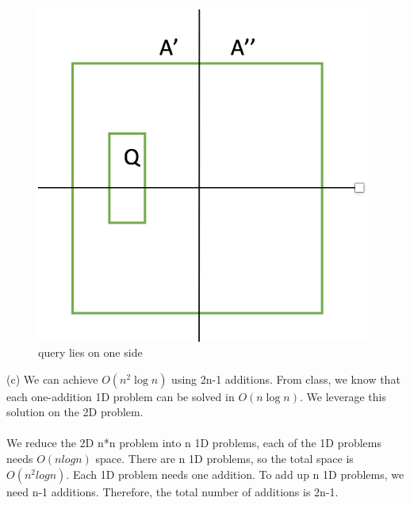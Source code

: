 \begin{problem}{4}
\begin{figure}[H] 
\centering 
\includegraphics[width=0.5\columnwidth]{2}
\caption{query lies on one side}
\end{figure}
(c) We can achieve $O(n^2\log{n})$ using 2n-1 additions. From class, we know that each one-addition 1D problem can be solved in $O(n\log{n})$. We leverage this solution on the 2D problem.\\
\\
We reduce the 2D n*n problem into n 1D problems, each of the 1D problems needs $O(nlogn)$ space. There are n 1D problems, so the total space is $O(n^2logn)$. Each 1D problem needs one addition. To add up n 1D problems, we need n-1 additions. Therefore, the total number of additions is 2n-1.
\end{problem}